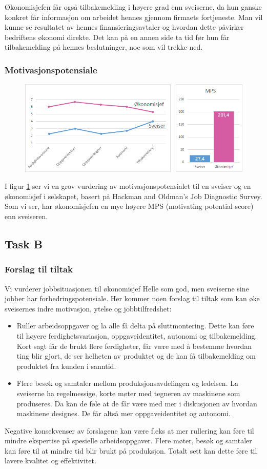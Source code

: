 Økonomisjefen får også tilbakemelding i høyere grad enn sveiserne, da hun ganske konkret får informasjon om arbeidet hennes gjennom firmaets fortjeneste. Man vil kunne se resultatet av hennes finansieringsavtaler og hvordan dette påvirker bedriftens økonomi direkte. Det kan på en annen side ta tid før hun får tilbakemelding på hennes beslutninger, noe som vil trekke ned.

\subsubsection{Motivasjonspotensiale}
\begin{figure}[ht!]
    \centering
    \includegraphics[width=135mm]{mps.png}
    \label{fig:mps}
\end{figure}
I figur \ref{fig:mps} ser vi en grov vurdering av motivasjonspotensialet til en sveiser og en økonomisjef i selskapet, basert på Hackman and Oldman’s Job Diagnostic Survey. Som vi ser, har økonomisjefen en mye høyere MPS (motivating potential score) enn sveiseren.


\subsection{Task B}
\subsubsection{Forslag til tiltak}
Vi vurderer jobbsituasjonen til økonomisjef Helle som god, men sveiserne sine jobber har forbedringspotensiale. Her kommer noen forslag til tiltak som kan øke sveisernes indre motivasjon, ytelse og jobbtilfredshet:

\begin{itemize}
  \item Ruller arbeidsoppgaver og la alle få delta på sluttmontering. Dette kan føre til høyere ferdighetsvariasjon, oppgaveidentitet, autonomi og tilbakemelding. Kort sagt får de brukt flere ferdigheter, får være med å bestemme hvordan ting blir gjort, de ser helheten av produktet og de kan få tilbakemelding om produktet fra kunden i sanntid.
  \item Flere besøk og samtaler mellom produksjonsavdelingen og ledelsen. La sveiserne ha regelmessige, korte møter med tegneren av maskinene som produseres. Da kan de føle at de får være med mer i diskusjonen av hvordan maskinene designes. De får altså mer oppgaveidentitet og autonomi.
\end{itemize}

Negative konsekvenser av forslagene kan være f.eks at mer rullering kan føre til mindre ekspertise på spesielle arbeidsoppgaver. Flere møter, besøk og samtaler kan føre til at mindre tid blir brukt på produksjon. Totalt sett kan dette føre til lavere kvalitet og effektivitet.
